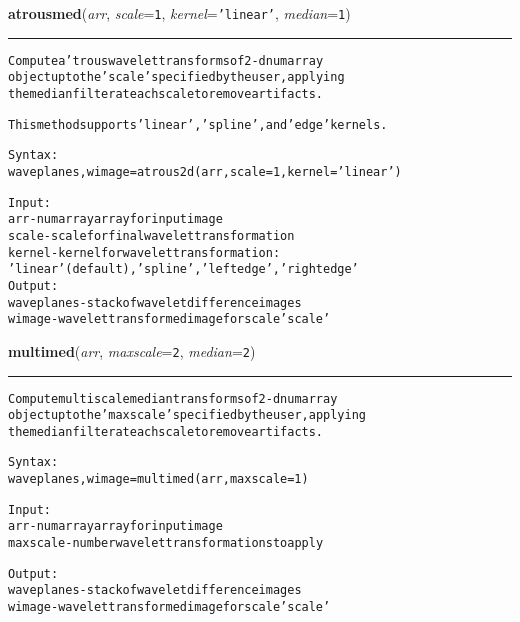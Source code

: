     \begin{boxedminipage}{\textwidth}

    \raggedright \textbf{atrousmed}(\textit{arr}, \textit{scale}=\texttt{1\-}, \textit{kernel}=\texttt{'\-l\-i\-n\-e\-a\-r\-'\-}, \textit{median}=\texttt{1\-})

    \vspace{-1.5ex}

    \rule{\textwidth}{0.5\fboxrule}
\begin{alltt}
Compute a' trous wavelet transforms of 2-d numarray
object up to the 'scale' specified by the user, applying
the median filter at each scale to remove artifacts.

This method supports 'linear', 'spline', and 'edge' kernels.

Syntax:
    waveplanes,wimage = atrous2d(arr,scale=1,kernel='linear')

Input:
    arr        - numarray array for input image
    scale      - scale for final wavelet transformation
    kernel     - kernel for wavelet transformation:
                    'linear'(default),'spline','leftedge','rightedge'
Output:
    waveplanes - stack of wavelet difference images
    wimage     - wavelet transformed image for scale 'scale'\end{alltt}

    \vspace{1ex}

    \end{boxedminipage}

    \label{multireg:atrous:multimed}
    \vspace{0.5ex}

    \begin{boxedminipage}{\textwidth}

    \raggedright \textbf{multimed}(\textit{arr}, \textit{maxscale}=\texttt{2\-}, \textit{median}=\texttt{2\-})

    \vspace{-1.5ex}

    \rule{\textwidth}{0.5\fboxrule}
\begin{alltt}
Compute multiscale median transforms of 2-d numarray
object up to the 'maxscale' specified by the user, applying
the median filter at each scale to remove artifacts.
        
Syntax:
    waveplanes,wimage = multimed(arr,maxscale=1)

Input:
    arr        - numarray array for input image
    maxscale   - number wavelet transformations to apply

Output:
    waveplanes - stack of wavelet difference images
    wimage     - wavelet transformed image for scale 'scale'\end{alltt}

    \vspace{1ex}

    \end{boxedminipage}


